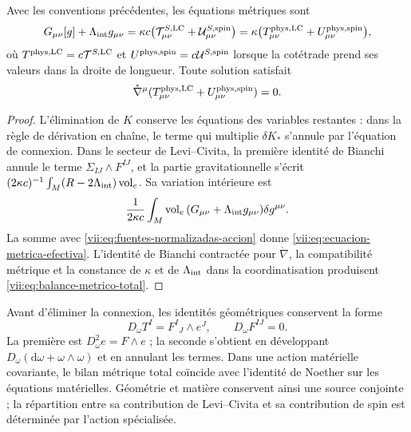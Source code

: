 \begin{proposition}
\label{vii:prop:fuente-metrica-balance}
Avec les conventions précédentes, les équations métriques sont
\begin{equation}
 G_{\mu\nu}[g]+\Lambda_{\rm int}g_{\mu\nu}
 =\kappa c\bigl(\mathcal T^{S,\rm LC}_{\mu\nu}
                    +\mathcal U^{S,\rm spin}_{\mu\nu}\bigr)
 =\kappa\bigl(T^{\rm phys,LC}_{\mu\nu}
                    +U^{\rm phys,spin}_{\mu\nu}\bigr),
 \label{vii:eq:ecuacion-metrica-efectiva}
\end{equation}
où \(T^{\rm phys,LC}=c\mathcal T^{S,\rm LC}\) et \(U^{\rm phys,spin}=c\mathcal U^{S,\rm spin}\) lorsque la cotétrade prend ses valeurs dans la droite de longueur. Toute solution satisfait
\begin{equation}
 \mathring\nabla^\mu
   (T^{\rm phys,LC}_{\mu\nu}+U^{\rm phys,spin}_{\mu\nu})=0.
 \label{vii:eq:balance-metrico-total}
\end{equation}
\end{proposition}
\begin{proof}
L'élimination de \(K\) conserve les équations des variables
restantes : dans la règle de dérivation en chaîne, le terme qui multiplie
\(\delta K_*\) s'annule par l'équation de connexion. Dans le secteur
de Levi--Civita, la première identité de Bianchi annule le terme
\(\Sigma_{IJ}\wedge F^{IJ}\), et la partie gravitationnelle s'écrit
\((2\kappa c)^{-1}\int_M(R-2\Lambda_{\rm int})\operatorname{vol}_e\).
Sa variation intérieure est
\[
 \frac1{2\kappa c}\int_M\operatorname{vol}_e\,
        (G_{\mu\nu}+\Lambda_{\rm int}g_{\mu\nu})\delta g^{\mu\nu}.
\]
La somme avec \eqref{vii:eq:fuentes-normalizadas-accion} donne \eqref{vii:eq:ecuacion-metrica-efectiva}. L'identité de Bianchi contractée pour \(\mathring\nabla\), la compatibilité métrique et la constance de \(\kappa\) et de \(\Lambda_{\rm int}\) dans la coordinatisation produisent \eqref{vii:eq:balance-metrico-total}.
\end{proof}

Avant d'éliminer la connexion, les identités géométriques conservent
la forme
\begin{equation}
 D_\omega T^I=F^I{}_{J}\wedge e^J,\qquad D_\omega F^{IJ}=0.
 \label{vii:eq:bianchi-cartan}
\end{equation}
La première est \(D_\omega^2e=F\wedge e\) ; la seconde s'obtient
en développant \(D_\omega(\mathrm d\omega+\omega\wedge\omega)\)
et en annulant les termes. Dans une action matérielle covariante, le
bilan métrique total coïncide avec l'identité de Noether sur les
équations matérielles. Géométrie et matière conservent ainsi une source
conjointe ; la répartition entre sa contribution de Levi--Civita et sa
contribution de spin est déterminée par l'action spécialisée.
